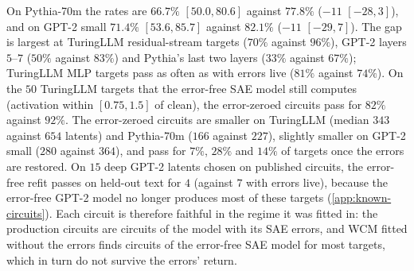 \documentclass[10pt]{article}
\begin{document}
On Pythia-70m the rates are $66.7\%$ $[50.0, 80.6]$ against $77.8\%$ ($-11$ $[-28, 3]$), and on GPT-2 small $71.4\%$ $[53.6, 85.7]$ against $82.1\%$ ($-11$ $[-29, 7]$).
The gap is largest at TuringLLM residual-stream targets ($70\%$ against $96\%$), GPT-2 layers $5$--$7$ ($50\%$ against $83\%$) and Pythia's last two layers ($33\%$ against $67\%$); TuringLLM MLP targets pass as often as with errors live ($81\%$ against $74\%$).
On the $50$ TuringLLM targets that the error-free SAE model still computes (activation within $[0.75, 1.5]$ of clean), the error-zeroed circuits pass for $82\%$ against $92\%$.
The error-zeroed circuits are smaller on TuringLLM (median $343$ against $654$ latents) and Pythia-70m ($166$ against $227$), slightly smaller on GPT-2 small ($280$ against $364$), and pass for $7\%$, $28\%$ and $14\%$ of targets once the errors are restored.
On $15$ deep GPT-2 latents chosen on published circuits, the error-free refit passes on held-out text for $4$ (against $7$ with errors live), because the error-free GPT-2 model no longer produces most of these targets (\cref{app:known-circuits}).
Each circuit is therefore faithful in the regime it was fitted in: the production circuits are circuits of the model with its SAE errors, and WCM fitted without the errors finds circuits of the error-free SAE model for most targets, which in turn do not survive the errors' return.
\end{document}
